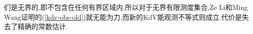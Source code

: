 \begin{frame}[t]
  们是无界的,即不包含在任何有界区域内.所以对于无界有限测度集合,Ze Li和Ming Wang证明的(\ref{kdv-obs-old})就无能为力,而新的KdV能观测不等式则成立.代价是失去了精确的常数估计.
\end{frame}


\iffalse
\begin{frame}[t]
  Consider the following linear Korteweg-de Vries (KdV) equation
  \begin{equation}\label{3}
    \partial_t u +\partial_x^3u=0,\quad u(0,x)=u_0(x)\in L^2(\R).
  \end{equation}
  Our aim is to prove the observability inequality at two points in time as (\ref{obsch}) for (\ref{3}),

  i.e.,
  \begin{equation}\label{7}
    \int_{\R}|u_0(x)|^2\,\mathrm{d}x\le C \left( \int_{\R\setminus S}|u_0(x)|^2\,\mathrm{d}x + \int_{\R\setminus \Sigma} |u(t,x)|\,\mathrm{d}x  \right), 
  \end{equation}
  where $C$ is a constant depending on $t$ and finite sets $S$ and $\Sigma$. 
\end{frame}
\fi

